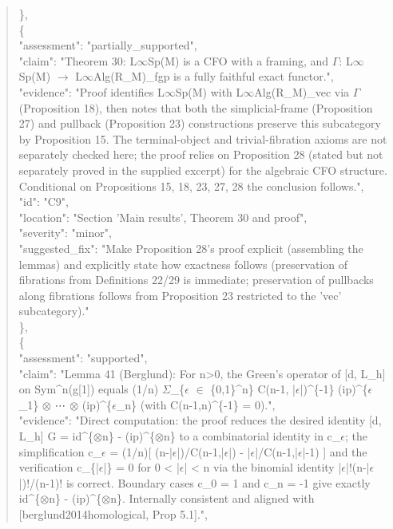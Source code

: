 \documentclass[11pt]{article}
\begin{document}
\begin{quote}
    \},\\
    \{\\
      "assessment": "partially\_supported",\\
      "claim": "Theorem 30: L\ensuremath{\infty}Sp(M) is a CFO with a framing, and \ensuremath{\Gamma}: L\ensuremath{\infty}Sp(M) \ensuremath{\to} L\ensuremath{\infty}Alg(R\_M)\_fgp is a fully faithful exact functor.",\\
      "evidence": "Proof identifies L\ensuremath{\infty}Sp(M) with L\ensuremath{\infty}Alg(R\_M)\_vec via \ensuremath{\Gamma} (Proposition 18), then notes that both the simplicial-frame (Proposition 27) and pullback (Proposition 23) constructions preserve this subcategory by Proposition 15. The terminal-object and trivial-fibration axioms are not separately checked here; the proof relies on Proposition 28 (stated but not separately proved in the supplied excerpt) for the algebraic CFO structure. Conditional on Propositions 15, 18, 23, 27, 28 the conclusion follows.",\\
      "id": "C9",\\
      "location": "Section 'Main results', Theorem 30 and proof",\\
      "severity": "minor",\\
      "suggested\_fix": "Make Proposition 28's proof explicit (assembling the lemmas) and explicitly state how exactness follows (preservation of fibrations from Definitions 22/29 is immediate; preservation of pullbacks along fibrations follows from Proposition 23 restricted to the 'vec' subcategory)."\\
    \},\\
    \{\\
      "assessment": "supported",\\
      "claim": "Lemma 41 (Berglund): For n>0, the Green's operator of [d, L\_h] on Sym\^{}n(g[1]) equals (1/n) \ensuremath{\Sigma}\_\{\ensuremath{\epsilon} \ensuremath{\in} \{0,1\}\^{}n\} C(n-1, |\ensuremath{\epsilon}|)\^{}\{-1\} (ip)\^{}\{\ensuremath{\epsilon}\_1\} \ensuremath{\otimes} ⋯ \ensuremath{\otimes} (ip)\^{}\{\ensuremath{\epsilon}\_n\} (with C(n-1,n)\^{}\{-1\} = 0).",\\
      "evidence": "Direct computation: the proof reduces the desired identity [d, L\_h] G = id\^{}\{\ensuremath{\otimes}n\} - (ip)\^{}\{\ensuremath{\otimes}n\} to a combinatorial identity in c\_\ensuremath{\epsilon}; the simplification c\_\ensuremath{\epsilon} = (1/n)[ (n-|\ensuremath{\epsilon}|)/C(n-1,|\ensuremath{\epsilon}|) - |\ensuremath{\epsilon}|/C(n-1,|\ensuremath{\epsilon}|-1) ] and the verification c\_\{|\ensuremath{\epsilon}|\} = 0 for 0 < |\ensuremath{\epsilon}| < n via the binomial identity |\ensuremath{\epsilon}|!(n-|\ensuremath{\epsilon}|)!/(n-1)! is correct. Boundary cases c\_0 = 1 and c\_n = -1 give exactly id\^{}\{\ensuremath{\otimes}n\} - (ip)\^{}\{\ensuremath{\otimes}n\}. Internally consistent and aligned with [berglund2014homological, Prop 5.1].",\\

\end{quote}
\end{document}
